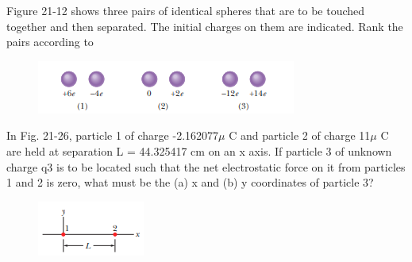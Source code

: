 \documentclass[11pt]{exam}
\begin{document}
\newpage 


\begin{questions}





\addpoints
\question[10] Figure 21-12 shows three pairs of identical spheres that are to be touched together and then separated. The initial charges on them are indicated. Rank the pairs according to\begin{figure}[H]
\centering
\includegraphics[scale=0.8]{assets/Halliday_ch21q2.png}
\end{figure}
\newpage

\addpoints
\question[10] In Fig. 21-26, particle 1 of charge -2.162077$\mu$ C and particle  2 of charge 11$\mu$ C are held at separation L = 44.325417 cm on an x axis. If particle 3 of unknown charge q3 is to be located such that the net electrostatic force on it from particles 1 and 2 is zero, what must be the (a) x and (b) y coordinates of particle 3?\begin{figure}[H]
\centering
\includegraphics[scale=0.8]{assets/Halliday_ch21p13.png}
\end{figure}
\newpage


\end{questions}
\end{document}
